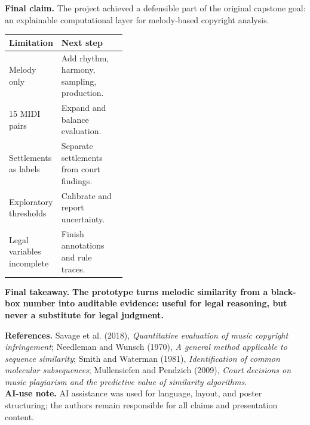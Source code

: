 \documentclass[portrait,a0,final]{a0poster}
\newcommand{\subtitlefont}{\fontsize{28}{34}\selectfont}
\newcommand{\sectionfont}{\fontsize{29}{34}\selectfont}
\newcommand{\bodyfont}{\fontsize{21.5}{27}\selectfont}
\newcommand{\tinyfont}{\fontsize{12.8}{16}\selectfont}
\newcommand{\blockhead}[2]{%
  \noindent
  \tikz[baseline=(n.base)]{
    \node[fill=epflred,text=white,rounded corners=1mm,
      inner xsep=3.2mm,inner ysep=1.7mm,
      font=\bfseries\sectionfont] (n) {#1};
    \node[anchor=west,text=epflred,font=\bfseries\sectionfont]
      at ([xshift=4mm]n.east) {#2};
  }\par\vspace{3mm}
}
\begin{document}
\hfill
\begin{minipage}[t]{0.318\textwidth}
\begin{panelbox}[height=193mm]
\blockhead{8}{Conclusion}
\textbf{Final claim.}
The project achieved a defensible part of the original capstone goal: an explainable computational layer for melody-based copyright analysis.

\vspace{3mm}
\begin{tabularx}{\linewidth}{@{}L{0.39\linewidth}Y@{}}
\toprule
\textbf{Limitation} & \textbf{Next step}\\
\midrule
Melody only & Add rhythm, harmony, sampling, production.\\
15 MIDI pairs & Expand and balance evaluation.\\
Settlements as labels & Separate settlements from court findings.\\
Exploratory thresholds & Calibrate and report uncertainty.\\
Legal variables incomplete & Finish annotations and rule traces.\\
\bottomrule
\end{tabularx}
\end{panelbox}
\end{minipage}

\vspace{9mm}

\begin{tcolorbox}[
  enhanced,
  colback=epflred,
  colframe=epflred,
  boxrule=0pt,
  sharp corners,
  left=8mm,
  right=8mm,
  top=5mm,
  bottom=5mm
]
{\subtitlefont\bfseries\color{white} Final takeaway.}
\hspace{3mm}
{\bodyfont\bfseries\color{white} The prototype turns melodic similarity from a black-box number into auditable evidence: useful for legal reasoning, but never a substitute for legal judgment.}
\end{tcolorbox}

\vfill

\begin{tcolorbox}[
  enhanced,
  colback=ink,
  colframe=ink,
  boxrule=0pt,
  sharp corners,
  left=7mm,
  right=7mm,
  top=4mm,
  bottom=4mm
]
{\tinyfont\color{white}
\textbf{References.}
Savage et al. (2018), \textit{Quantitative evaluation of music copyright infringement};
Needleman and Wunsch (1970), \textit{A general method applicable to sequence similarity};
Smith and Waterman (1981), \textit{Identification of common molecular subsequences};
Mullensiefen and Pendzich (2009), \textit{Court decisions on music plagiarism and the predictive value of similarity algorithms}.\\
\textbf{AI-use note.}
AI assistance was used for language, layout, and poster structuring; the authors remain responsible for all claims and presentation content.}
\end{tcolorbox}
\end{document}

